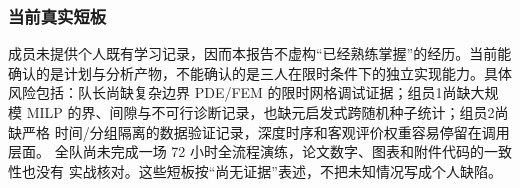 \subsubsection{当前真实短板}

成员未提供个人既有学习记录，因而本报告不虚构“已经熟练掌握”的经历。当前能
确认的是计划与分析产物，不能确认的是三人在限时条件下的独立实现能力。具体
风险包括：队长尚缺复杂边界 PDE/FEM 的限时网格调试证据；组员1尚缺大规模
MILP 的界、间隙与不可行诊断记录，也缺元启发式跨随机种子统计；组员2尚缺严格
时间/分组隔离的数据验证记录，深度时序和客观评价权重容易停留在调用层面。
全队尚未完成一场 72 小时全流程演练，论文数字、图表和附件代码的一致性也没有
实战核对。这些短板按“尚无证据”表述，不把未知情况写成个人缺陷。

